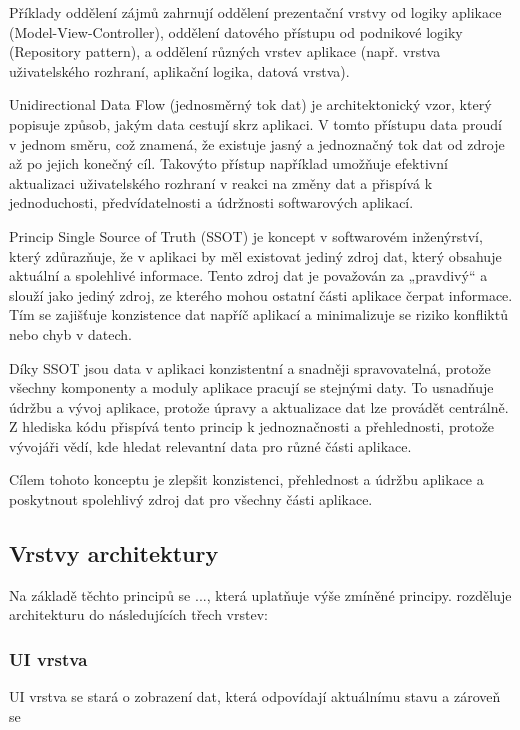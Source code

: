 Příklady oddělení zájmů zahrnují oddělení prezentační vrstvy od logiky aplikace (Model-View-Controller), oddělení datového přístupu od 
podnikové logiky (Repository pattern), a oddělení různých vrstev aplikace (např. vrstva uživatelského rozhraní, aplikační logika, datová vrstva). 

Unidirectional Data Flow (jednosměrný tok dat) je architektonický vzor, který popisuje způsob, jakým data cestují skrz aplikaci. 
V tomto přístupu data proudí v jednom směru, což znamená, že existuje jasný a jednoznačný tok dat od zdroje až po jejich konečný cíl.
Takovýto přístup například umožňuje efektivní aktualizaci uživatelského rozhraní v reakci na změny dat a přispívá k jednoduchosti, 
předvídatelnosti a údržnosti softwarových aplikací.

Princip Single Source of Truth (SSOT) je koncept v softwarovém inženýrství, který zdůrazňuje, že v aplikaci by měl existovat jediný 
zdroj dat, který obsahuje aktuální a spolehlivé informace. Tento zdroj dat je považován za „pravdivý“ a slouží jako jediný zdroj, 
ze kterého mohou ostatní části aplikace čerpat informace. Tím se zajišťuje konzistence dat napříč aplikací a minimalizuje se riziko 
konfliktů nebo chyb v datech.

Díky SSOT jsou data v aplikaci konzistentní a snadněji spravovatelná, protože všechny komponenty a moduly aplikace pracují se stejnými 
daty. To usnadňuje údržbu a vývoj aplikace, protože úpravy a aktualizace dat lze provádět centrálně. Z hlediska kódu přispívá tento
princip k jednoznačnosti a přehlednosti, protože vývojáři vědí, kde hledat relevantní data pro různé části aplikace.

Cílem tohoto konceptu je zlepšit konzistenci, přehlednost a údržbu aplikace a poskytnout spolehlivý zdroj dat pro všechny části aplikace.


\subsection{Vrstvy architektury} \label{vrstvyArchitekturySection} 

Na základě těchto principů se ..., která uplatňuje výše zmíněné principy.
rozděluje architekturu do následujících třech vrstev:

\subsubsection*{UI vrstva}
UI vrstva se stará o zobrazení dat, která odpovídají aktuálnímu stavu a zároveň se 

